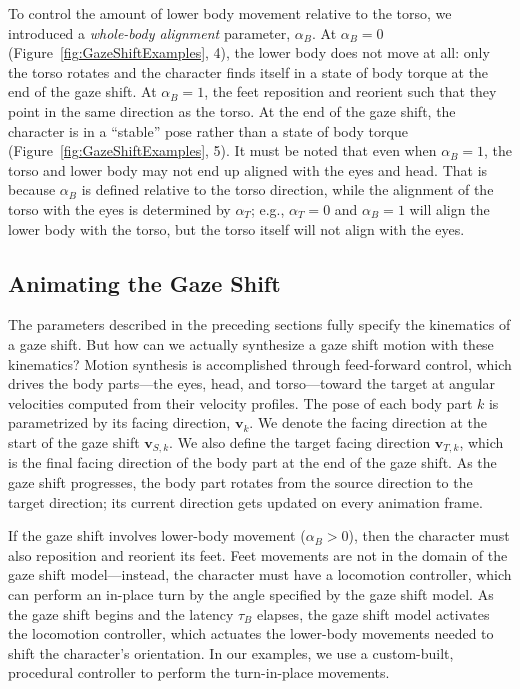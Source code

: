 To control the amount of lower body movement relative to the torso, we introduced a \emph{whole-body alignment} parameter, $\alpha_B$. At $\alpha_B = 0$ (Figure~\ref{fig:GazeShiftExamples}, 4), the lower body does not move at all: only the torso rotates and the character finds itself in a state of body torque at the end of the gaze shift. At $\alpha_B = 1$, the feet reposition and reorient such that they point in the same direction as the torso. At the end of the gaze shift, the character is in a ``stable'' pose rather than a state of body torque (Figure~\ref{fig:GazeShiftExamples}, 5). It must be noted that even when $\alpha_B = 1$, the torso and lower body may not end up aligned with the eyes and head. That is because $\alpha_B$ is defined relative to the torso direction, while the alignment of the torso with the eyes is determined by $\alpha_T$; e.g., $\alpha_T = 0$ and $\alpha_B = 1$ will align the lower body with the torso, but the torso itself will not align with the eyes.

\subsection{Animating the Gaze Shift}
\label{sec:GazeShiftAnimation}

The parameters described in the preceding sections fully specify the kinematics of a gaze shift. But how can we actually synthesize a gaze shift motion with these kinematics? Motion synthesis is accomplished through feed-forward control, which drives the body parts---the eyes, head, and torso---toward the target at angular velocities computed from their velocity profiles. The pose of each body part $k$ is parametrized by its facing direction, $\mathbf{v}_k$. We denote the facing direction at the start of the gaze shift $\mathbf{v}_{S,k}$. We also define the target facing direction $\mathbf{v}_{T,k}$, which is the final facing direction of the body part at the end of the gaze shift. As the gaze shift progresses, the body part rotates from the source direction to the target direction; its current direction gets updated on every animation frame.

If the gaze shift involves lower-body movement ($\alpha_B > 0$), then the character must also reposition and reorient its feet. Feet movements are not in the domain of the gaze shift model---instead, the character must have a locomotion controller, which can perform an in-place turn by the angle specified by the gaze shift model. As the gaze shift begins and the latency $\tau_B$ elapses, the gaze shift model activates the locomotion controller, which actuates the lower-body movements needed to shift the character's orientation. In our examples, we use a custom-built, procedural controller to perform the turn-in-place movements.

